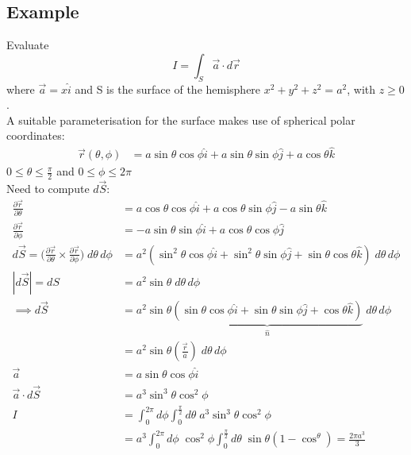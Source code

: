 \documentclass[a4paper, 11pt, normalem]{report}
\newcommand\p{\partial}
\begin{document}
\subsection{Example}
Evaluate
\begin{equation*}
    I = \int_S \vec{a} \cdot d\vec{r}
\end{equation*}
where $\vec{a} = x\hat{i}$ and S is the surface of the hemisphere $x^2 + y^2 + z^2 = a^2$, with $z \geq 0$. \\
A suitable parameterisation for the surface makes use of spherical polar coordinates:
\begin{align*}
    \vec{r}(\theta, \phi) &= a\sin\theta\cos\phi \hat{i} + a\sin\theta\sin\phi \hat{j} + a\cos\theta\hat{k}
\end{align*}
$0 \leq \theta \leq \frac{\pi}{2}$ and $0 \leq \phi \leq 2\pi$ \\
Need to compute $d\vec{S}$:
\begin{align*}
    \frac{\p \vec{r}}{\p \theta} &= a\cos\theta\cos\phi \hat{i} + a\cos\theta\sin\phi \hat{j} - a\sin\theta \hat{k} \\
    \frac{\p \vec{r}}{\p \phi} &= -a\sin\theta\sin\phi \hat{i} + a\cos\theta\cos\phi \hat{j} \\
    d\vec{S} = \Big(\frac{\p \vec{r}}{\p \theta} \times \frac{\p \vec{r}}{\p \phi}\Big)\;d\theta\,d\phi &= a^2(\sin^2\theta\cos\phi \hat{i} + \sin^2\theta\sin\phi \hat{j} + \sin\theta\cos\theta \hat{k})\;d\theta\,d\phi \\
    |d\vec{S}| = dS &= a^2\sin\theta\;d\theta\,d\phi \\
    \implies d\vec{S} &= a^2\sin\theta \underbrace{(\sin\theta\cos\phi \hat{i} + \sin\theta\sin\phi \hat{j} + \cos\theta \hat{k})}_{\hat{n}}\;d\theta\,d\phi \\
    &= a^2\sin\theta (\frac{\vec{r}}{a})\;d\theta\,d\phi \\
    \vec{a} &= a\sin\theta\cos\phi \hat{i} \\
    \vec{a} \cdot d\vec{S} &= a^3 \sin^3\theta \cos^2\phi \\
    I &= \int_{0}^{2\pi}d\phi \int_{0}^{\frac{\pi}{2}} d\theta\; a^3 \sin^3\theta \cos^2\phi \\
    &= a^3 \int_{0}^{2\pi} d\phi\; \cos^2\phi \int_{0}^{\frac{\pi}{2}} d\theta\; \sin\theta(1 - \cos^\theta) = \frac{2\pi a^3}{3}
\end{align*}
\end{document}
